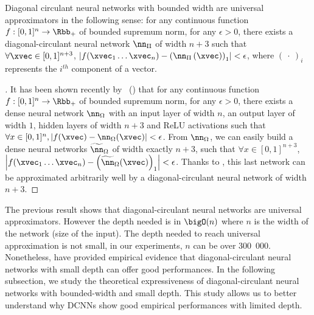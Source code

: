 

\begin{maincorollary}
  \label{corollary:ch4-universal_approximation}
  Diagonal circulant neural networks with bounded width are universal approximators in the following sense:
  for any continuous function $f:[0,1]^n \rightarrow \Rbb_+$ of bounded supremum norm, for any $\epsilon > 0$, there exists a diagonal-circulant neural network $\nn_\Pi$ of width $n+3$ such that $\forall \xvec \in [0,1]^{n+3}$, $\left| f(\xvec_{1} \ldots \xvec_{n}) - \left( \nn_\Pi \left( \xvec \right) \right)_{1} \right| < \epsilon$, where $\left(\ \cdot\ \right)_{i}$ represents the $i^{th}$ component of a vector.
  \removespace
\end{maincorollary}


\begin{proof}[]
  It has been shown recently by~\citet{hanin2017universal} () that for any continuous function $f:[0,1]^{n} \rightarrow \Rbb_+$ of bounded supremum norm, for any $\epsilon > 0$, there exists a dense neural network $\nn_\Omega$ with an input layer of width $n$, an output layer of width $1$, hidden layers of width $n+3$ and ReLU activations such that $\forall x \in [0,1]^n, \left| f(\xvec) - \nn_\Omega (\xvec) \right| < \epsilon$.
From $\nn_\Omega$, we can easily build a dense neural networks $\widetilde{\nn}_\Omega$ of width exactly $n+3$, such that $\forall x \in [0,1]^{n+3}$, $\left| f(\xvec_{1} \ldots \xvec_{n}) - \left(\widetilde{\nn}_\Omega (\xvec) \right)_{1}\right| < \epsilon$.
Thanks to , this last network can be approximated arbitrarily well by a diagonal-circulant neural network of width $n+3$.
\end{proof}

The previous result shows that diagonal-circulant neural networks are universal approximators.
However the depth needed is in $\bigO(n)$ where $n$ is the width of the network (size of the input).
The depth needed to reach universal approximation is not small, in our experiments, $n$ can be over 300~000.
Nonetheless, \citet{cheng2015exploration} have provided empirical evidence that diagonal-circulant neural networks with small depth can offer good performances.
In the following subsection, we study the theoretical expressiveness of diagonal-circulant neural networks with bounded-width and small depth.
This study allows us to better understand why DCNNs show good empirical performances with limited depth.

